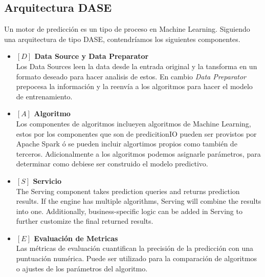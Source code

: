 



\subsection{Arquitectura DASE}


Un motor de predicción es un tipo de proceso en Machine Learning. Siguiendo una arquitectura de tipo {DASE}, contendríamos los siguientes componentes.



\begin{itemize}

  \item \textbf{ $[D]$ Data Source y Data Preparator }\\
  Los Data Sources leen la data desde la entrada original y la tansforma en un formato deseado para hacer analisis de estos. En cambio \emph{Data Preparator} prepocesa la información y la reenvía a los algoritmos para   hacer el modelo de entrenamiento.


    \item \textbf{ $[A]$ Algoritmo}\\
  Los componentes de algoritmos inclueyen algoritmos de Machine Learning, estos por los componentes que son de predicitionIO pueden ser provistos por Apache Spark ó se pueden incluir algortimos propios como también de terceros.
  Adicionalmente a los algoritmos podemos asignarle parámetros, para determinar como debiese ser construido el modelo predictivo.



    \item \textbf{ $[S]$ Servicio}\\
  The Serving component takes prediction queries and returns prediction results. If the engine has multiple algorithms, Serving will combine the results into one. Additionally, business-specific logic can be added in Serving to further customize the final returned results.

    \item \textbf{ $[E]$ Evaluación de Metricas}\\
  Las métricas de evaluación cuantifican la precisión de la predicción con una puntuación numérica. Puede ser utilizado para la comparación de algoritmos o ajustes de los parámetros del algoritmo.


\end{itemize}



